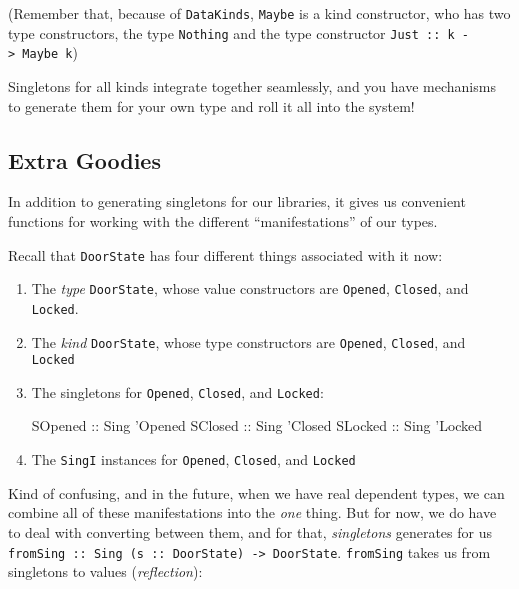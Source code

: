 \documentclass[]{article}
\newenvironment{Shaded}{}{}
\newcommand{\DataTypeTok}[1]{\textcolor[rgb]{0.56,0.13,0.00}{#1}}
\newcommand{\CharTok}[1]{\textcolor[rgb]{0.25,0.44,0.63}{#1}}
\newcommand{\OtherTok}[1]{\textcolor[rgb]{0.00,0.44,0.13}{#1}}
\begin{document}
(Remember that, because of \texttt{DataKinds}, \texttt{Maybe} is a kind
constructor, who has two type constructors, the type
\texttt{\textquotesingle{}Nothing} and the type constructor
\texttt{\textquotesingle{}Just\ ::\ k\ -\textgreater{}\ Maybe\ k})

Singletons for all kinds integrate together seamlessly, and you have mechanisms
to generate them for your own type and roll it all into the system!

\subsection{Extra Goodies}\label{extra-goodies}

In addition to generating singletons for our libraries, it gives us convenient
functions for working with the different ``manifestations'' of our types.

Recall that \texttt{DoorState} has four different things associated with it now:

\begin{enumerate}
\def\labelenumi{\arabic{enumi}.}
\item
  The \emph{type} \texttt{DoorState}, whose value constructors are
  \texttt{Opened}, \texttt{Closed}, and \texttt{Locked}.
\item
  The \emph{kind} \texttt{DoorState}, whose type constructors are
  \texttt{\textquotesingle{}Opened}, \texttt{\textquotesingle{}Closed}, and
  \texttt{\textquotesingle{}Locked}
\item
  The singletons for \texttt{\textquotesingle{}Opened},
  \texttt{\textquotesingle{}Closed}, and \texttt{\textquotesingle{}Locked}:

\begin{Shaded}
\begin{Highlighting}[]
\DataTypeTok{SOpened}\OtherTok{ ::} \DataTypeTok{Sing} \CharTok{'Opened}
\DataTypeTok{SClosed}\OtherTok{ ::} \DataTypeTok{Sing} \CharTok{'Closed}
\DataTypeTok{SLocked}\OtherTok{ ::} \DataTypeTok{Sing} \CharTok{'Locked}
\end{Highlighting}
\end{Shaded}
\item
  The \texttt{SingI} instances for \texttt{\textquotesingle{}Opened},
  \texttt{\textquotesingle{}Closed}, and
  \texttt{\textquotesingle{}Locked\textquotesingle{}}
\end{enumerate}

Kind of confusing, and in the future, when we have real dependent types, we can
combine all of these manifestations into the \emph{one} thing. But for now, we
do have to deal with converting between them, and for that, \emph{singletons}
generates for us
\texttt{fromSing\ ::\ Sing\ (s\ ::\ DoorState)\ -\textgreater{}\ DoorState}.
\texttt{fromSing} takes us from singletons to values (\emph{reflection}):
\end{document}
